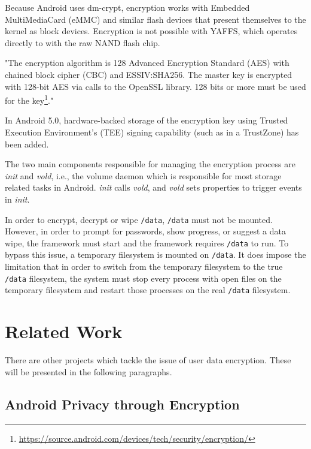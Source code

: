 Because Android uses dm-crypt, encryption works with Embedded MultiMediaCard (eMMC) and similar flash devices that present themselves to the kernel as block devices. Encryption is not possible with YAFFS, which operates directly to with the raw NAND flash chip.

"The encryption algorithm is 128 Advanced Encryption Standard (AES) with chained block cipher (CBC) and ESSIV:SHA256. The master key is encrypted with 128-bit AES via calls to the OpenSSL library. 128 bits or more must be used for the key\footnote{\url{https://source.android.com/devices/tech/security/encryption/}}."

In Android 5.0, hardware-backed storage of the encryption key using Trusted Execution Environment’s (TEE) signing capability (such as in a TrustZone) has been added.

The two main components responsible for managing the encryption process are \textit{init} and \textit{vold}, i.e., the volume daemon which is responsible for most storage related tasks in Android. \textit{init} calls \textit{vold}, and \textit{vold} sets properties to trigger events in \textit{init}.

In order to encrypt, decrypt or wipe \texttt{/data}, \texttt{/data} must not be mounted. However, in order to prompt for passwords, show progress, or suggest a data wipe, the framework must start and the framework requires \texttt{/data} to run. To bypass this issue, a temporary filesystem is mounted on \texttt{/data}. It does impose the limitation that in order to switch from the temporary filesystem to the true \texttt{/data} filesystem, the system must stop every process with open files on the temporary filesystem and restart those processes on the real \texttt{/data} filesystem.

\section{Related Work}
\label{sec:related-work}

There are other projects which tackle the issue of user data encryption. These will be presented in the following paragraphs.

\subsection{Android Privacy through Encryption}
\label{sub-sec:and-priv-defreez}

